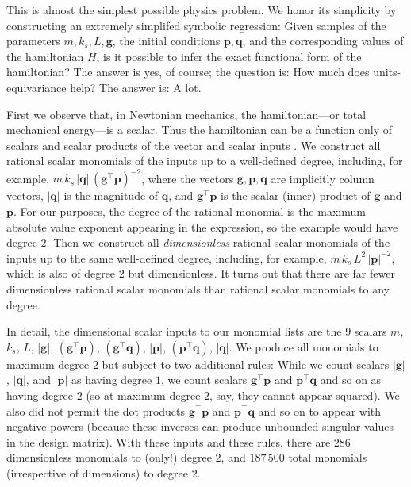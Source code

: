\documentclass[twoside,11pt]{article}
\begin{document}
This is almost the simplest possible physics problem.
We honor its simplicity by constructing an extremely simplifed symbolic regression:
Given samples of the parameters $m,k_s,L,\mathbf{g}$, the initial conditions $\mathbf{p},\mathbf{q}$, and the corresponding values of the hamiltonian $H$, is it possible to infer the exact functional form of the hamiltonian?
The answer is yes, of course; the question is: How much does units-equivariance help?
The answer is: A lot.

First we observe that, in Newtonian mechanics, the hamiltonian---or total mechanical energy---is a scalar.
Thus the hamiltonian can be a function only of scalars and scalar products of the vector and scalar inputs \citep{villar}.
We construct all rational scalar monomials of the inputs up to a well-defined degree, including, for example, $m\,k_s\,|\mathbf{q}|\,(\mathbf{g}^\top \mathbf{p})^{-2}$, where the vectors $\mathbf{g},\mathbf{p},\mathbf{q}$ are implicitly column vectors, $|\mathbf{q}|$ is the magnitude of $\mathbf{q}$, and $\mathbf{g}^\top \mathbf{p}$ is the scalar (inner) product of $\mathbf{g}$ and $\mathbf{p}$.
For our purposes, the degree of the rational monomial is the maximum absolute value exponent appearing in the expression, so the example would have degree $2$.
Then we construct all \emph{dimensionless} rational scalar monomials of the inputs up to the same well-defined degree, including, for example, $m\,k_s\,L^2\,|\mathbf{p}|^{-2}$, which is also of degree $2$ but dimensionless.
It turns out that there are far fewer dimensionless rational scalar monomials than rational scalar monomials to any degree.

In detail, the dimensional scalar inputs to our monomial lists are the $9$ scalars $m$, $k_s$, $L$, $|\mathbf{g}|$, $(\mathbf{g}^\top \mathbf{p})$, $(\mathbf{g}^\top \mathbf{q})$, $|\mathbf{p}|$, $(\mathbf{p}^\top \mathbf{q})$, $|\mathbf{q}|$.
We produce all monomials to maximum degree $2$ but subject to two additional rules:
While we count scalars $|\mathbf{g}|$, $|\mathbf{q}|$, and $|\mathbf{p}|$ as having degree $1$, we count scalars $\mathbf{g}^\top \mathbf{p}$ and $\mathbf{p}^\top \mathbf{q}$ and so on as having degree $2$ (so at maximum degree $2$, say, they cannot appear squared).
We also did not permit the dot products $\mathbf{g}^\top \mathbf{p}$ and $\mathbf{p}^\top \mathbf{q}$ and so on to appear with negative powers (because these inverses can produce unbounded singular values in the design matrix).
With these inputs and these rules, there are $286$ dimensionless monomials to (only!) degree $2$, and $187\,500$ total monomials (irrespective of dimensions) to degree $2$.
\end{document}
